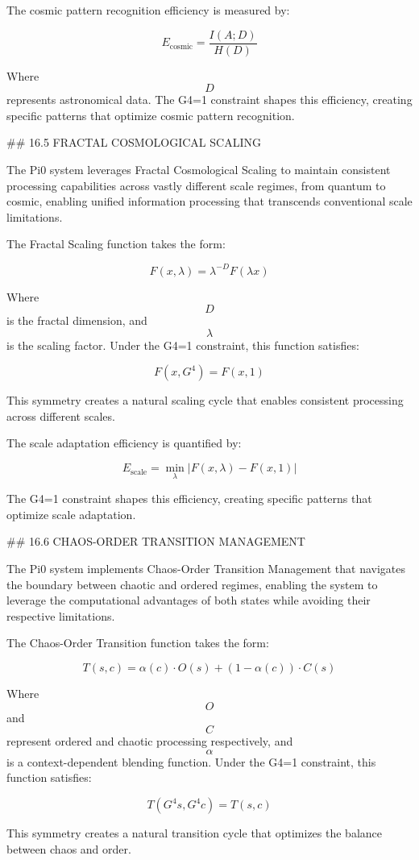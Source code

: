 The cosmic pattern recognition efficiency is measured by:

$$ E_{\text{cosmic}} = \frac{I(A; D)}{H(D)} $$

Where $$ D $$ represents astronomical data. The G4=1 constraint shapes this efficiency, creating specific patterns that optimize cosmic pattern recognition.

## 16.5 FRACTAL COSMOLOGICAL SCALING

The Pi0 system leverages Fractal Cosmological Scaling to maintain consistent processing capabilities across vastly different scale regimes, from quantum to cosmic, enabling unified information processing that transcends conventional scale limitations.

The Fractal Scaling function takes the form:

$$ F(x, \lambda) = \lambda^{-D} F(\lambda x) $$

Where $$ D $$ is the fractal dimension, and $$ \lambda $$ is the scaling factor. Under the G4=1 constraint, this function satisfies:

$$ F(x, G^4) = F(x, 1) $$

This symmetry creates a natural scaling cycle that enables consistent processing across different scales.

The scale adaptation efficiency is quantified by:

$$ E_{\text{scale}} = \min_{\lambda} |F(x, \lambda) - F(x, 1)| $$

The G4=1 constraint shapes this efficiency, creating specific patterns that optimize scale adaptation.

## 16.6 CHAOS-ORDER TRANSITION MANAGEMENT

The Pi0 system implements Chaos-Order Transition Management that navigates the boundary between chaotic and ordered regimes, enabling the system to leverage the computational advantages of both states while avoiding their respective limitations.

The Chaos-Order Transition function takes the form:

$$ T(s, c) = \alpha(c) \cdot O(s) + (1-\alpha(c)) \cdot C(s) $$

Where $$ O $$ and $$ C $$ represent ordered and chaotic processing respectively, and $$ \alpha $$ is a context-dependent blending function. Under the G4=1 constraint, this function satisfies:

$$ T(G^4 s, G^4 c) = T(s, c) $$

This symmetry creates a natural transition cycle that optimizes the balance between chaos and order.

